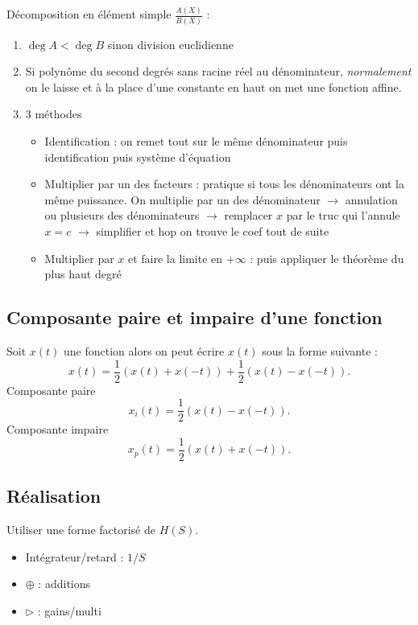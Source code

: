 \documentclass[9pt]{article}
\begin{document}
\begin{multicols}{3}
Décomposition en élément simple $ \frac{A(X)}{B(X)} $ : \begin{enumerate}
    \item $ \deg A < \deg B $ sinon division euclidienne
    \item Si polynôme du second degrés sans racine réel au dénominateur, \textit{normalement} on le laisse et à la place d'une constante en haut on met une fonction affine. 
    \item 3 méthodes \begin{itemize}
        \item Identification : on remet tout sur le même dénominateur puis identification puis système d'équation
        \item Multiplier par un des facteurs : pratique si tous les dénominateurs ont la même puissance. On multiplie par un des dénominateur $\rightarrow$ annulation ou plusieurs des dénominateurs $\rightarrow$ remplacer $ x $ par le truc qui l'annule $ x=c $ $\rightarrow$ simplifier et hop on trouve le coef tout de suite
        \item Multiplier par $ x $  et faire la limite en $ +\infty  $  : puis appliquer le théorème du plus haut degré
    \end{itemize}
\end{enumerate}

\subsection{Composante paire et impaire d'une fonction}
Soit $ x(t) $ une fonction alors on peut écrire $ x(t) $ sous la forme suivante : 
\[
    x(t) = \frac{1}{2}(x(t) + x(-t)) + \frac{1}{2}(x(t) - x(-t))
.\]
Composante paire 
\[
    x_i(t) = \frac{1}{2}(x(t) - x(-t))
.\]
Composante impaire 
\[
    x_p(t) = \frac{1}{2}(x(t) + x(-t))
.\]
\subsection{Réalisation}
Utiliser une forme factorisé de $ H(S) $. \begin{itemize}
    \item Intégrateur/retard : $ 1/S $ 
    \item $ \oplus $ : additions
    \item $ \rhd $ : gains/multi
\end{itemize}


\end{multicols}
\end{document}
